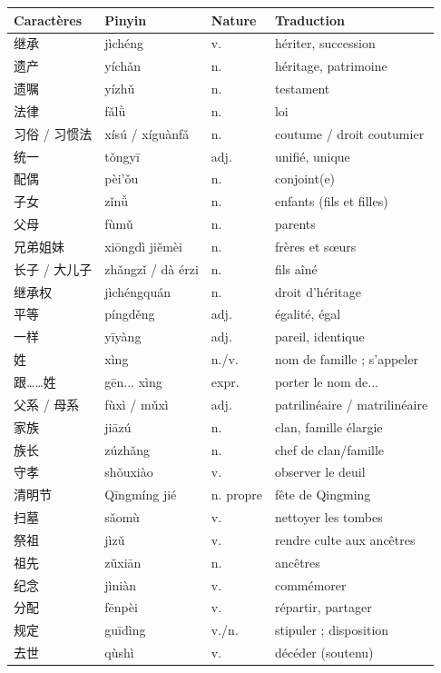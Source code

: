 \documentclass[11pt]{article}
\begin{document}
\begin{center}
\begin{tabularx}{\linewidth}{|X|X|X|X|}
\hline
\rowcolor{popblueL} Caractères & Pinyin & Nature & Traduction \\
\hline
继承 & jìchéng & v. & hériter, succession \\
\hline
遗产 & yíchǎn & n. & héritage, patrimoine \\
\hline
遗嘱 & yízhǔ & n. & testament \\
\hline
法律 & fǎlǜ & n. & loi \\
\hline
习俗 / 习惯法 & xísú / xíguànfǎ & n. & coutume / droit coutumier \\
\hline
统一 & tǒngyī & adj. & unifié, unique \\
\hline
配偶 & pèi'ǒu & n. & conjoint(e) \\
\hline
子女 & zǐnǚ & n. & enfants (fils et filles) \\
\hline
父母 & fùmǔ & n. & parents \\
\hline
兄弟姐妹 & xiōngdì jiěmèi & n. & frères et sœurs \\
\hline
长子 / 大儿子 & zhǎngzǐ / dà érzi & n. & fils aîné \\
\hline
继承权 & jìchéngquán & n. & droit d'héritage \\
\hline
平等 & píngděng & adj. & égalité, égal \\
\hline
一样 & yīyàng & adj. & pareil, identique \\
\hline
姓 & xìng & n./v. & nom de famille ; s'appeler \\
\hline
跟……姓 & gēn... xìng & expr. & porter le nom de... \\
\hline
父系 / 母系 & fùxì / mǔxì & adj. & patrilinéaire / matrilinéaire \\
\hline
家族 & jiāzú & n. & clan, famille élargie \\
\hline
族长 & zúzhǎng & n. & chef de clan/famille \\
\hline
守孝 & shǒuxiào & v. & observer le deuil \\
\hline
清明节 & Qīngmíng jié & n. propre & fête de Qingming \\
\hline
扫墓 & sǎomù & v. & nettoyer les tombes \\
\hline
祭祖 & jìzǔ & v. & rendre culte aux ancêtres \\
\hline
祖先 & zǔxiān & n. & ancêtres \\
\hline
纪念 & jìniàn & v. & commémorer \\
\hline
分配 & fēnpèi & v. & répartir, partager \\
\hline
规定 & guīdìng & v./n. & stipuler ; disposition \\
\hline
去世 & qùshì & v. & décéder (soutenu) \\
\hline
\end{tabularx}
\end{center}
\end{document}
